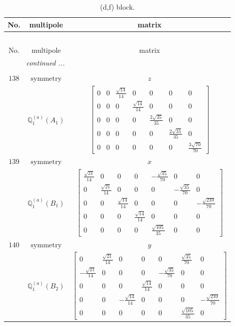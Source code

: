 \documentclass[fleqn,8pt,landscape]{jsarticle}
\begin{document}
\begin{longtable}{ccc}
\caption{(d,f) block.}
 \\
 \hline \hline
No. & multipole & matrix \\ \hline \endfirsthead

\multicolumn{2}{l}{\tablename\ \thetable{}} \\
 \hline \hline
No. & multipole & matrix \\ \hline \endhead

 \hline \hline
\multicolumn{2}{r}{\footnotesize\it continued ...} \\ \endfoot

 \hline \hline
\multicolumn{2}{r}{} \\ \endlastfoot

$ 138 $ & $ \text{symmetry} $ & $ z $ \\
$  $ & $ \mathbb{Q}_{1}^{(a)}(A_{1}) $ & $ \begin{bmatrix} 0 & 0 & \frac{\sqrt{14}}{14} & 0 & 0 & 0 & 0 \\ 0 & 0 & 0 & \frac{\sqrt{14}}{14} & 0 & 0 & 0 \\ 0 & 0 & 0 & 0 & \frac{2 \sqrt{35}}{35} & 0 & 0 \\ 0 & 0 & 0 & 0 & 0 & \frac{2 \sqrt{35}}{35} & 0 \\ 0 & 0 & 0 & 0 & 0 & 0 & \frac{3 \sqrt{70}}{70} \end{bmatrix} $ \\ \hline
$ 139 $ & $ \text{symmetry} $ & $ x $ \\
$  $ & $ \mathbb{Q}_{1}^{(a)}(B_{1}) $ & $ \begin{bmatrix} \frac{\sqrt{21}}{14} & 0 & 0 & 0 & - \frac{\sqrt{35}}{70} & 0 & 0 \\ 0 & \frac{\sqrt{21}}{14} & 0 & 0 & 0 & - \frac{\sqrt{35}}{70} & 0 \\ 0 & 0 & \frac{\sqrt{14}}{14} & 0 & 0 & 0 & - \frac{\sqrt{210}}{70} \\ 0 & 0 & 0 & \frac{\sqrt{14}}{14} & 0 & 0 & 0 \\ 0 & 0 & 0 & 0 & \frac{\sqrt{105}}{35} & 0 & 0 \end{bmatrix} $ \\ \hline
$ 140 $ & $ \text{symmetry} $ & $ y $ \\
$  $ & $ \mathbb{Q}_{1}^{(a)}(B_{2}) $ & $ \begin{bmatrix} 0 & \frac{\sqrt{21}}{14} & 0 & 0 & 0 & \frac{\sqrt{35}}{70} & 0 \\ - \frac{\sqrt{21}}{14} & 0 & 0 & 0 & - \frac{\sqrt{35}}{70} & 0 & 0 \\ 0 & 0 & 0 & \frac{\sqrt{14}}{14} & 0 & 0 & 0 \\ 0 & 0 & - \frac{\sqrt{14}}{14} & 0 & 0 & 0 & - \frac{\sqrt{210}}{70} \\ 0 & 0 & 0 & 0 & 0 & \frac{\sqrt{105}}{35} & 0 \end{bmatrix} $ \\ \hline

\end{longtable}
\end{document}
